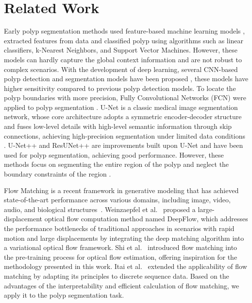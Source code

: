 \section{Related Work}
Early polyp segmentation methods used feature-based machine learning models \cite{mamonov2014automated,tischendorf2010computer,zhou2021review}, extracted features from data and classified polyp using algorithms such as linear classifiers, k-Nearest Neighbors, and Support Vector Machines. 
However, these models can hardly capture the global context information and are not robust to complex scenarios. 
With the development of deep learning, several CNN-based polyp detection and segmentation models have been proposed \cite{tajbakhsh2015automated,zhang2018polyp}, these models have higher sensitivity compared to previous polyp detection models.
To locate the polyp boundaries with more precision, Fully Convolutional Networks (FCN) were applied to polyp segmentation \cite{akbari2018polyp,brandao2017fully}. 
U-Net is a classic medical image segmentation network, whose core architecture adopts a symmetric encoder-decoder structure and fuses low-level details with high-level semantic information through skip connections, achieving high-precision segmentation under limited data conditions \cite{ronneberger2015u}.
U-Net++ \cite{zhou2018unet++} and ResUNet++ \cite{jha2019resunet++} are improvements built upon U-Net and have been used for polyp segmentation, achieving good performance. 
However, these methods focus on segmenting the entire region of the polyp and neglect the boundary constraints of the region \cite{fan2020pranet}.

Flow Matching is a recent framework in generative modeling that has achieved state-of-the-art performance across various domains, including image, video, audio, and biological structures~\cite{lipman2024flow,yun2025flowhigh,lipman2022flow}. Weinzaepfel et al.~\cite{weinzaepfel2013deepflow} proposed a large-displacement optical flow computation method named DeepFlow, which addresses the performance bottlenecks of traditional approaches in scenarios with rapid motion and large displacements by integrating the deep matching algorithm into a variational optical flow framework. Shi et al.~\cite{shi2023flowformer++} introduced flow matching into the pre-training process for optical flow estimation, offering inspiration for the methodology presented in this work. Itai et al.~\cite{gat2025discrete} extended the applicability of flow matching by adapting its principles to discrete sequence data. Based on the advantages of the interpretability and efficient calculation of flow matching, we apply it to the polyp segmentation task. 

